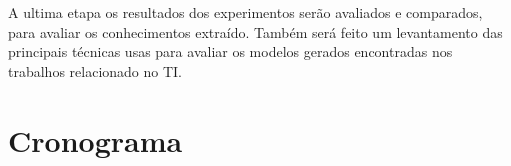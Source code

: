 \documentclass[diss-proposta,nocipinfo]{texufpel}
\begin{document}
A ultima etapa os resultados dos experimentos serão avaliados e comparados, para avaliar os conhecimentos extraído. Também será feito um levantamento das principais técnicas usas para avaliar os modelos gerados encontradas nos trabalhos relacionado no TI.








\chapter{Cronograma}
\end{document}
